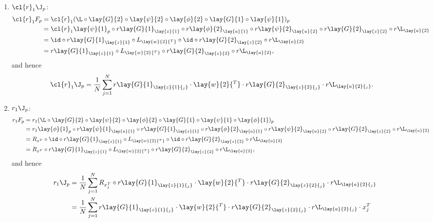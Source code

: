 \begin{enumerate}
	\item $\cl{r}_1\J_p$:
	\begin{align*}
		\cl{r}_1F_p&=\cl{r}_1(\L\circ\lay{G}{2}\circ\lay{\psi}{2}\circ\lay{\phi}{2}\circ\lay{G}{1}\circ\lay{\psi}{1})_p\\
		&=\cl{r}_1\lay{\psi}{1}_p\circ r\lay{G}{1}_{\lay{z}{1}}\circ r\lay{\phi}{2}_{\lay{a}{1}}\circ r\lay{\psi}{2}_{\lay{u}{2}}\circ r\lay{G}{2}_{\lay{z}{2}}\circ r\L_{\lay{a}{2}}\\
		&=\id\circ r\lay{G}{1}_{\lay{z}{1}}\circ L_{\lay{w}{2}{^T}}\circ\id\circ r\lay{G}{2}_{\lay{z}{2}}\circ r\L_{\lay{a}{2}}\\
		&=r\lay{G}{1}_{\lay{z}{1}}\circ L_{\lay{w}{2}{^T}}\circ r\lay{G}{2}_{\lay{z}{2}}\circ r\L_{\lay{a}{2}},
	\end{align*}
	and hence
	\begin{align*}
		\cl{r}_1\J_p&=\frac{1}{N}\sum_{j=1}^Nr\lay{G}{1}_{\lay{z}{1}{_j}}\cdot\lay{w}{2}{^T}\cdot r\lay{G}{2}_{\lay{z}{2}{_j}}\cdot r\L_{\lay{a}{2}{_j}}.
	\end{align*}
	
	\item $r_1\J_p$:
	\begin{align*}
		r_1F_p&=r_1(\L\circ\lay{G}{2}\circ\lay{\psi}{2}\circ\lay{\phi}{2}\circ\lay{G}{1}\circ\lay{\psi}{1}\circ\lay{\phi}{1})_p\\
		&=r_1\lay{\phi}{1}_p\circ r\lay{\psi}{1}_{\lay{u}{1}}\circ r\lay{G}{1}_{\lay{z}{1}}\circ r\lay{\phi}{2}_{\lay{a}{1}}\circ r\lay{\psi}{2}_{\lay{u}{2}}\circ r\lay{G}{2}_{\lay{z}{2}}\circ r\L_{\lay{a}{2}}\\
		&=R_{x^T}\circ\id\circ r\lay{G}{1}_{\lay{z}{1}}\circ L_{\lay{w}{2}{^T}}\circ\id\circ r\lay{G}{2}_{\lay{z}{2}}\circ r\L_{\lay{a}{2}}\\
		&=R_{x^T}\circ r\lay{G}{1}_{\lay{z}{1}}\circ L_{\lay{w}{2}{^T}}\circ r\lay{G}{2}_{\lay{z}{2}}\circ r\L_{\lay{a}{2}},
	\end{align*}
	and hence
	\begin{align*}
		r_1\J_p&=\frac{1}{N}\sum_{j=1}^NR_{x_j^T}\circ r\lay{G}{1}_{\lay{z}{1}{_j}}\cdot\lay{w}{2}{^T}\cdot r\lay{G}{2}_{\lay{z}{2}{_j}}\cdot r\L_{\lay{a}{2}{_j}}\\
		&=\frac{1}{N}\sum_{j=1}^Nr\lay{G}{1}_{\lay{z}{1}{_j}}\cdot\lay{w}{2}{^T}\cdot r\lay{G}{2}_{\lay{z}{2}{_j}}\cdot r\L_{\lay{a}{2}{_j}}\cdot x_j^T
	\end{align*}
\end{enumerate}










